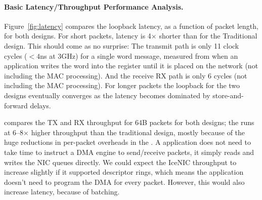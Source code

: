 \paragraph{Basic Latency/Throughput Performance Analysis.} 
Figure~\ref{fig:latency} compares the loopback latency, as a function of packet length, for both designs. For short packets, \name{} latency is 4$\times$ shorter than for the Traditional design. This should come as no surprise: The \name{} transmit path is only 11 clock cycles ($<4$ns at 3GHz) for a single word message, measured from when an application writes the word into the register until it is placed on the network (not including the MAC processing). And the \name{} receive RX path is only 6 cycles (not including the MAC processing). For longer packets the loopback for the two designs eventually converges as the latency becomes dominated by store-and-forward delays. 

 compares the TX and RX throughput for 64B packets for both designs; the \name{} runs at 6--8$\times$ higher throughput than the traditional design, mostly because of the huge reductions in per-packet overheads in the \name{}.
A \name{} application does not need to take time to instruct a DMA engine to send/receive packets, it simply reads and writes the NIC queues directly. We could expect the IceNIC throughput to increase slightly if it supported descriptor rings, which means the application doesn't need to program the DMA for every packet. However, this would also increase latency, because of batching.



